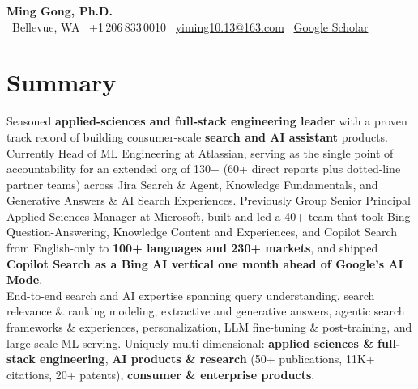 \documentclass[10.5pt,letterpaper]{article}
\begin{document}
\begin{center}
  {\LARGE\bfseries\color{blue!60!black} Ming Gong, Ph.D.}\\[3pt]
  \faMapMarker* \ Bellevue, WA \quad \textbar \quad
  \faPhone \ +1\,206\,833\,0010 \quad \textbar \quad
  \faEnvelope \ \href{mailto:yiming10.13@163.com}{yiming10.13@163.com} \quad \textbar \quad
  \faGraduationCap \ \href{https://scholar.google.com/citations?user=c7JEFwsAAAAJ}{Google Scholar}
\end{center}

\section*{Summary}
Seasoned \textbf{applied-sciences and full-stack engineering leader} with a proven track record of building consumer-scale \textbf{search and AI assistant} products. Currently Head of ML Engineering at Atlassian, serving as the single point of accountability for an extended org of 130+ (60+ direct reports plus dotted-line partner teams) across Jira Search \& Agent, Knowledge Fundamentals, and Generative Answers \& AI Search Experiences. Previously Group Senior Principal Applied Sciences Manager at Microsoft, built and led a 40+ team that took Bing Question-Answering, Knowledge Content and Experiences, and Copilot Search from English-only to \textbf{100+ languages and 230+ markets}, and shipped \textbf{Copilot Search as a Bing AI vertical one month ahead of Google's AI Mode}.\\[4pt]
End-to-end search and AI expertise spanning query understanding, search relevance \& ranking modeling, extractive and generative answers, agentic search frameworks \& experiences, personalization, LLM fine-tuning \& post-training, and large-scale ML serving. Uniquely multi-dimensional: \textbf{applied sciences \& full-stack engineering}, \textbf{AI products \& research} (50+ publications, 11K+ citations, 20+ patents), \textbf{consumer \& enterprise products}.

\end{document}
